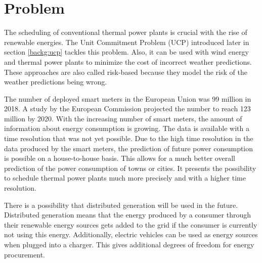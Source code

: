 \section{Problem}

The scheduling of conventional thermal power plants is crucial with the rise of renewable energies.
The Unit Commitment Problem (UCP) introduced later in section \ref{backg:ucp} tackles this problem.
\cite{Banos2011}
Also, it can be used with wind energy and thermal power plants to minimize the cost of incorrect weather predictions.
These approaches are also called risk-based because they model the risk of the weather predictions being wrong.
\cite{Chen2008,Abujarad2017}

The number of deployed smart meters in the European Union was 99 million in 2018.
A study by the European Commission projected the number to reach 123 million by 2020.
\cite{Vlachogiannis2019}
With the increasing number of smart meters, the amount of information about energy consumption is growing.
The data is available with a time resolution that was not yet possible.
Due to the high time resolution in the data produced by the smart meters,
the prediction of future power consumption is possible on a house-to-house basis.
This allows for a much better overall prediction of the power consumption of towns or cities.
\cite{Aiello2016, Basu2013}
It presents the possibility to schedule thermal power plants much more precisely
and with a higher time resolution.

There is a possibility that distributed generation will be used in the future.
Distributed generation means that the energy produced by a consumer through their renewable energy sources gets added to the grid if the consumer is currently not using this energy.
Additionally, electric vehicles can be used as energy sources when plugged into a charger.
This gives additional degrees of freedom for energy procurement.
\cite{Aiello2016, Zhang2016}
